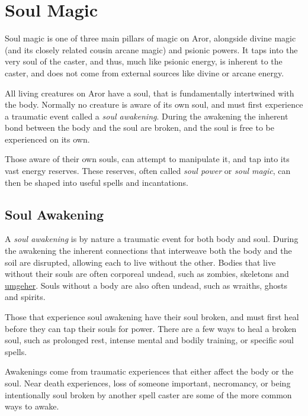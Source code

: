 \section{Soul Magic}
\label{sec:Soul Magic}

Soul magic is one of three main pillars of magic on Aror, alongside divine
magic (and its closely related cousin arcane magic) and psionic
powers. It taps into the very soul of the caster, and thus, much like psionic
energy, is inherent to the caster, and does not come from external sources
like divine or arcane energy.

All living creatures on Aror have a soul, that is fundamentally intertwined
with the body. Normally no creature is aware of its own soul, and must first
experience a traumatic event called a \emph{soul awakening}. During the
awakening the inherent bond between the body and the soul are broken, and the
soul is free to be experienced on its own.

Those aware of their own souls, can attempt to manipulate it, and tap into
its vast energy reserves. These reserves, often called \emph{soul power} or
\emph{soul magic}, can then be shaped into useful spells and incantations.

\subsection{Soul Awakening}
\label{sec:Soul Awakening}

A \emph{soul awakening} is by nature a traumatic event for both body and soul.
During the awakening the inherent connections that interweave both the body and
the soil are disrupted, allowing each to live without the other. Bodies that
live without their souls are often corporeal undead, such as zombies,
skeletons and \hyperref[sec:Umgeher]{umgeher}. Souls without a body are also
often undead, such as wraiths, ghosts and spirits.

Those that experience soul awakening have their soul broken, and must first
heal before they can tap their souls for power. There are a few ways to heal
a broken soul, such as prolonged rest, intense mental and bodily training, or
specific soul spells.

Awakenings come from traumatic experiences that either affect the body or the
soul. Near death experiences, loss of someone important, necromancy, or being
intentionally soul broken by another spell caster are some of the more common
ways to awake.

